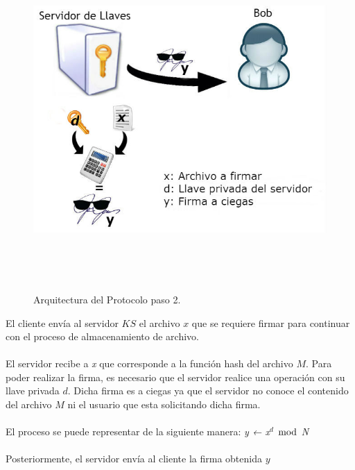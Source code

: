 \begin{figure}[H]
\centering
\includegraphics[width=16cm, height=13cm]{./images/Paso02.jpg}
\caption{Arquitectura del Protocolo paso 2.}

\end{figure}

El cliente envía al servidor $KS$ el archivo $x$ que se requiere firmar para continuar con el proceso de almacenamiento de archivo.\\ \\
El servidor recibe a \textit{x} que corresponde a la función hash del archivo $M$. Para poder realizar la firma, es necesario que el servidor realice una operación con su llave privada $d$. Dicha firma es a ciegas ya que el servidor no conoce el contenido del archivo $M$ ni el usuario que esta solicitando dicha firma. \\ \\
El proceso se puede representar de la siguiente manera: \hspace{2cm} \textit{y ← x$^d$ $\bmod$ N} \\ \\
Posteriormente, el servidor envía al cliente la firma obtenida $y$




